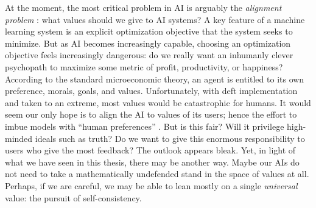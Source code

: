 At the moment, the most critical problem in
    AI is arguably the \emph{alignment problem}
\citep{wiener-alignment1960,alignment-zhuang-2020-NeurIPS,bostrom-superintelligence,christian2020alignment}:
what values should we give to AI systems? 
A key feature of a machine learning system is an explicit optimization objective that the system seeks to minimize. 
But as AI becomes increasingly capable, choosing an optimization objective 
    feels increasingly dangerous:
do we really want
an inhumanly clever psychopath to maximize some metric of profit, productivity, or happiness? 
According to the standard microeconomic theory, an agent is entitled to its own preference, morals, goals, and values.
Unfortunately, with deft implementation and taken to an extreme, most values would be catastrophic for humans. 
It would seem our only hope is to align the AI to values of its users;
    hence the effort to imbue models with 
    ``human preferences'' \citep{christiano2017deep}.
%
But is this fair? Will it privilege high-minded ideals such as truth? Do we want to give this enormous responsibility to users who give the most feedback?
The outlook appears bleak.
Yet, in light of what we have seen in this thesis, there may be another way. 
Maybe our AIs do not need to take a mathematically undefended stand in the space of values at all. 
Perhaps, if we are careful, we may be able to lean mostly on a single \emph{universal} value: 
the pursuit of self-consistency.


